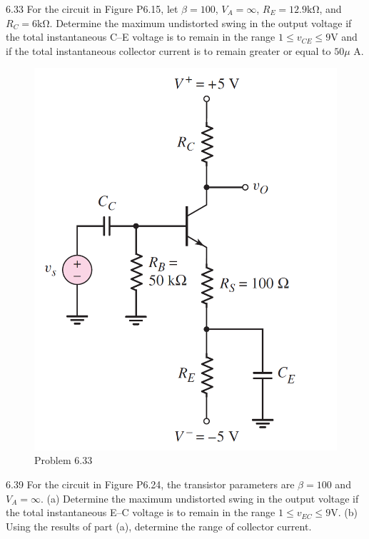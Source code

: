 \documentclass[a4paper,11pt,UTF8]{article}
\begin{document}
6.33 For the circuit in Figure P6.15, let $\beta = 100$, $V_A =\infty$, $R_E = 12.9 \mathrm{k\Omega}$, and
$R_C = 6 \mathrm{k\Omega}$. Determine the maximum undistorted swing in the output
voltage if the total instantaneous C–E voltage is to remain in the range
$1 \leq v_{CE} \leq 9 $V and if the total instantaneous collector current is to remain
greater or equal to $50 \mu$ A.
\begin{figure}[H] 
	\centering 
	\includegraphics[scale=0.20]{MD6.33.png}
	\caption{Problem 6.33}
\end{figure}
6.39 For the circuit in Figure P6.24, the transistor parameters are $\beta = 100$ and
$V_A =\infty$. (a) Determine the maximum undistorted swing in the output
voltage if the total instantaneous E–C voltage is to remain in the range
$1 \leq v_{EC} \leq 9 $V. (b) Using the results of part (a), determine the range of collector
current.
\end{document}
